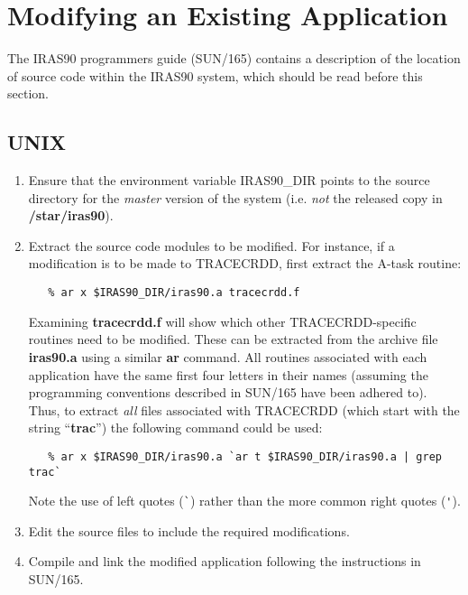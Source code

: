 \section{Modifying an Existing Application}
The {\small IRAS90} programmers guide (SUN/165) contains a description of the
location of source code within the {\small IRAS90} system, which should be read
before this section.

\subsection{UNIX}
\begin{enumerate}
\item Ensure that the environment variable {\small IRAS90\_DIR} points to the
source directory for the {\em master} version of the system (i.e. {\em not} the
released copy in {\bf /star/iras90}).
\item Extract the source code modules to be modified. For instance, if a
modification is to be made to {\small TRACECRDD}, first extract the A-task
routine:

\small
\begin{verbatim}
   % ar x $IRAS90_DIR/iras90.a tracecrdd.f
\end{verbatim}
\normalsize


Examining {\bf tracecrdd.f} will show which other {\small TRACECRDD}-specific
routines need to be modified. These can be extracted from the archive file {\bf
iras90.a} using a similar {\bf ar} command. All routines associated with each
application have the same first four letters in their names (assuming the
programming conventions described in SUN/165 have been adhered to). Thus, to
extract {\em all} files associated with {\small TRACECRDD} (which start
with the string ``{\bf trac}'') the following command could be used:

\small
\begin{verbatim}
   % ar x $IRAS90_DIR/iras90.a `ar t $IRAS90_DIR/iras90.a | grep trac`
\end{verbatim}
\normalsize

Note the use of left quotes (\verb+`+) rather than the more common right quotes
(\verb+'+).

\item Edit the source files to include the required modifications.

\item Compile and link the modified application following the instructions
in SUN/165.


\end{enumerate}
